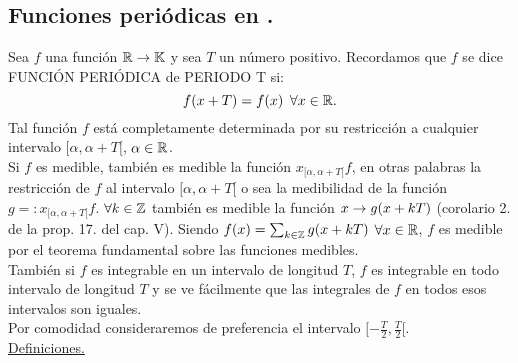 \subsection{Funciones periódicas en \R.}
Sea $f$ una función $\mathbb{R} \rightarrow \mathbb{K}$ y sea $T$ un número positivo. Recordamos que $f$ se dice FUNCIÓN PERIÓDICA de PERIODO T si:
$$
f(x+T)=f(x) \phantom{s} \forall x\in \mathbb{R}.
$$
Tal función $f$ está completamente determinada por su restricción a cualquier intervalo $[\alpha,\alpha + T[$, $\alpha \in \mathbb{R}$. \\
Si $f$ es medible, también es medible la función $x_{[\alpha , \alpha +T[}f$, en otras palabras la restricción de $f$ al intervalo $[\alpha , \alpha +T[$ o sea la medibilidad de la función $g=:x_{[\alpha , \alpha +T[}f$. $\forall k \in \mathbb{Z}$ también es medible la función $x \rightarrow g(x+kT)$ (corolario 2. de la prop. 17. del cap. V). Siendo $f(x)=\sum_{k \in \mathbb{Z}}g(x+kT)$ $\forall x \in \mathbb{R}$, $f$ es medible por el teorema fundamental sobre las funciones medibles. \\
También si $f$ es integrable en un intervalo de longitud $T$, $f$ es integrable en todo intervalo de longitud $T$ y se ve fácilmente que las integrales de $f$ en todos esos intervalos son iguales. \\
Por comodidad consideraremos de preferencia el intervalo $[-\frac{T}{2},\frac{T}{2}[$. \\
\underline{Definiciones.} \\
